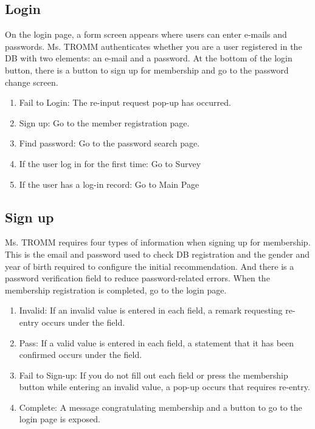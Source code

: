 \documentclass[conference]{IEEEtran}
\begin{document}
\subsection{Login}
On the login page, a form screen appears where users can enter e-mails and passwords. Ms. TROMM authenticates whether you are a user registered in the DB with two elements: an e-mail and a password. At the bottom of the login button, there is a button to sign up for membership and go to the password change screen.\\
\begin{enumerate}
    \item Fail to Login: The re-input request pop-up has occurred.\\
    \item Sign up: Go to the member registration page.\\
    \item Find password: Go to the password search page.\\
    \item If the user log in for the first time: Go to Survey\\
    \item If the user has a log-in record: Go to Main Page\\
\end{enumerate}

\subsection{Sign up}
Ms. TROMM requires four types of information when signing up for membership. This is the email and password used to check DB registration and the gender and year of birth required to configure the initial recommendation. And there is a password verification field to reduce password-related errors. When the membership registration is completed, go to the login page. \\
\begin{enumerate}
    \item Invalid: If an invalid value is entered in each field, a remark requesting re-entry occurs under the field.\\
    \item Pass: If a valid value is entered in each field, a statement that it has been confirmed occurs under the field.\\
    \item Fail to Sign-up: If you do not fill out each field or press the membership button while entering an invalid value, a pop-up occurs that requires re-entry.\\
    \item Complete: A message congratulating membership and a button to go to the login page is exposed.\\
\end{enumerate}
\end{document}
